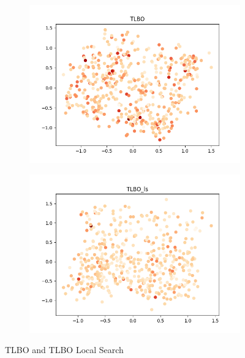 \documentclass[11pt, letterpaper, onecolumn]{article}
\begin{document}
\begin{figure}[h!]
  \centering
  \begin{subfigure}[b]{0.4\linewidth}
    \includegraphics[width=\linewidth]{graphs/TLBO__pca.png}
  \end{subfigure}
  \begin{subfigure}[b]{0.4\linewidth}
    \includegraphics[width=\linewidth]{graphs/TLBO_ls__pca.png}
  \end{subfigure}
  \caption{TLBO and TLBO Local Search}
  \label{fig:coffee}
\end{figure}
\end{document}
